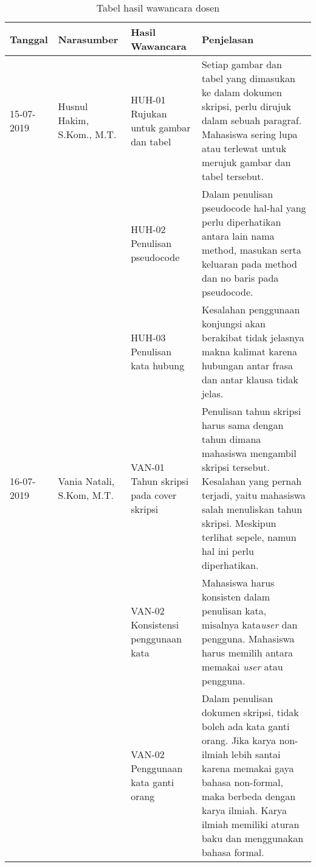 \begin{table}[H]
	\caption {Tabel hasil wawancara dosen} \label{tab:hasil_wawancara}
	\begin{center}
		\begin{tabular}{|p{2 cm}|>{\raggedright} p{3.5 cm}| p{4 cm}| p{5 cm}|}
		\hline
		Tanggal & Narasumber & Hasil Wawancara & Penjelasan \\ 
		\hline
		15-07-2019 & Husnul Hakim, S.Kom., M.T. & HUH-01 \newline Rujukan untuk gambar dan tabel & Setiap gambar dan tabel yang dimasukan ke dalam dokumen skripsi, perlu dirujuk dalam sebuah paragraf. Mahasiswa sering lupa atau terlewat untuk merujuk gambar dan tabel tersebut. \newline \\ 
		\hline
		 & & HUH-02 \newline Penulisan pseudocode & Dalam penulisan pseudocode hal-hal yang perlu diperhatikan antara lain nama method, masukan serta keluaran pada method dan no baris pada pseudocode.	 \newline \\ 
		\hline
		 & & HUH-03 \newline Penulisan kata hubung & Kesalahan penggunaan konjungsi akan berakibat tidak jelasnya makna kalimat karena hubungan antar frasa dan antar klausa tidak jelas. \newline \\ 
		\hline
		
		16-07-2019 & Vania Natali, S.Kom, M.T. & VAN-01 \newline Tahun skripsi pada cover skripsi & Penulisan tahun skripsi harus sama dengan tahun dimana mahasiswa mengambil skripsi tersebut. Kesalahan yang pernah terjadi, yaitu mahasiswa salah menuliskan tahun skripsi. Meskipun terlihat sepele, namun hal ini perlu diperhatikan.			 \newline \\ 
		\hline
		 & & VAN-02 \newline Konsistensi penggunaan kata & Mahasiswa harus konsisten dalam penulisan kata, misalnya kata\textit{user} dan pengguna.  Mahasiswa harus memilih antara memakai \textit{user} atau pengguna. \newline \\ 
		\hline
		 & & VAN-02 \newline Penggunaan kata ganti orang & Dalam penulisan dokumen skripsi, tidak boleh ada kata ganti orang. Jika karya non-ilmiah lebih santai karena memakai gaya bahasa non-formal, maka berbeda dengan karya ilmiah. Karya ilmiah memiliki aturan baku dan menggunakan bahasa formal.  \newline \\ 
		\hline
		\end{tabular}
	\end{center}
\end{table}

